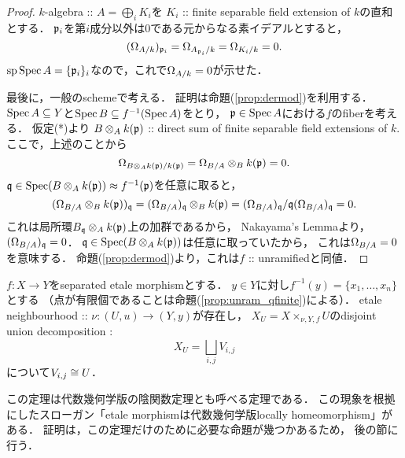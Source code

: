 \documentclass[a4paper]{jsarticle}
\begin{document}
\begin{proof}
    $k$-algebra :: $A=\bigoplus_i K_i$を
    $K_i$ :: finite separable field extension of $k$の直和とする．
    $\mathfrak{p}_i$を第$i$成分以外は$0$である元からなる素イデアルとすると，
    \[ (\Omega_{A/k})_{\mathfrak{p}_i}=\Omega_{A_{\mathfrak{p}_i}/k}=\Omega_{K_i/k}=0. \]
    $\operatorname{sp} \operatorname{Spec} A=\{ \mathfrak{p}_i \}_i$なので，これで$\Omega_{A/k}=0$が示せた．

    最後に，一般のschemeで考える．
    証明は命題(\ref{prop:dermod})を利用する．
    $\operatorname{Spec} A \subseteq Y$と$\operatorname{Spec} B \subseteq f^{-1}(\operatorname{Spec} A)$をとり，
    $\mathfrak{p} \in \operatorname{Spec} A$における$f$のfiberを考える．
    仮定(*)より
    $B \otimes_{A} k(\mathfrak{p})$ :: direct sum of finite separable field extensions of $k$.
    ここで，上述のことから
    \[ \Omega_{B \otimes_{A} k(\mathfrak{p})/k(\mathfrak{p})}=\Omega_{B/A} \otimes_{B} k(\mathfrak{p})=0. \]
    $\mathfrak{q} \in \operatorname{Spec} (B \otimes_A k(\mathfrak{p})) \approx f^{-1}(\mathfrak{p})$を任意に取ると，
    \[
        ( \Omega_{B/A} \otimes_{B} k(\mathfrak{p}) )_{\mathfrak{q}}
        =(\Omega_{B/A})_{\mathfrak{q}} \otimes_{B} k(\mathfrak{p})
        =(\Omega_{B/A})_{\mathfrak{q}}/\mathfrak{q}(\Omega_{B/A})_{\mathfrak{q}}
        =0.
    \]
    これは局所環$B_{\mathfrak{q}} \otimes_A k(\mathfrak{p})$上の加群であるから，
    Nakayama's Lemmaより，$(\Omega_{B/A})_{\mathfrak{q}}=0$．
    $\mathfrak{q} \in \operatorname{Spec} (B \otimes_A k(\mathfrak{p}))$は任意に取っていたから，
    これは$\Omega_{B/A}=0$を意味する．
    命題(\ref{prop:dermod})より，これは$f$ :: unramifiedと同値．
\end{proof}

\begin{Thm} \label{thm:impfunc}
    $f \colon X \to Y$をseparated etale morphismとする．
    $y \in Y$に対し$f^{-1}(y)=\{x_1,\dots,x_n \}$とする
    （点が有限個であることは命題(\ref{prop:unram_qfinite})による）．
    etale neighbourhood :: $\nu: (U, u) \to (Y, y)$が存在し，
    $X_U=X \times_{\nu, Y, f} U$のdisjoint union decomposition :
    \[ X_U=\bigsqcup_{i, j} V_{i, j} \]
    について$V_{i, j} \cong U$．
\end{Thm}

\begin{Remark}
この定理は代数幾何学版の陰関数定理とも呼べる定理である．
この現象を根拠にしたスローガン「etale morphismは代数幾何学版locally homeomorphism」がある．
証明は，この定理だけのために必要な命題が幾つかあるため，
後の節に行う．
\end{Remark}
\end{document}
